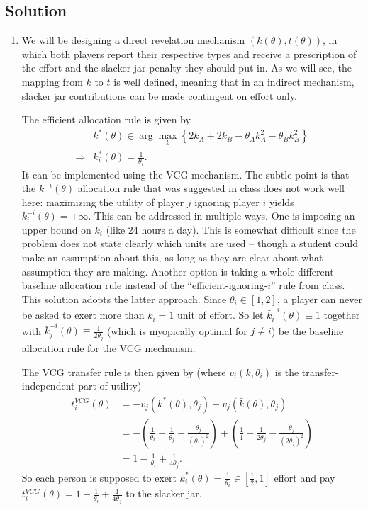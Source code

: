\documentclass[a4paper]{article}
\newif\ifsolutions
\begin{document}
\ifsolutions
\subsection*{Solution}
\begin{enumerate}
	\item We will be designing a direct revelation mechanism $(k(\theta),t(\theta))$, in which both players report their respective types and receive a prescription of the effort and the slacker jar penalty they should put in. As we will see, the mapping from $k$ to $t$ is well defined, meaning that in an indirect mechanism, slacker jar contributions can be made contingent on effort only.
	
	The efficient allocation rule is given by
	\begin{align*}
		&k^*(\theta) \in \arg \max_k \left\{ 2k_A + 2k_B - \theta_A k_A^2 - \theta_B k_B^2 \right\}
		\\
		\Rightarrow
		&k_i^*(\theta) = \frac{1}{\theta_i}.
	\end{align*}
	It can be implemented using the VCG mechanism. The subtle point is that the $k^{-i}(\theta)$ allocation rule that was suggested in class does not work well here: maximizing the utility of player $j$ ignoring player $i$ yields $k^{-i}_i(\theta) = +\infty$. This can be addressed in multiple ways. One is imposing an upper bound on $k_i$ (like 24 hours a day). This is somewhat difficult since the problem does not state clearly which units are used -- though a student could make an assumption about this, as long as they are clear about what assumption they are making. Another option is taking a whole different baseline allocation rule instead of the ``efficient-ignoring-$i$'' rule from class. This solution adopts the latter approach. Since $\theta_i \in [1,2]$, a player can never be asked to exert more than $k_i = 1$ unit of effort. So let $\bar{k}_i^{-i}(\theta) \equiv 1$ together with $\bar{k}_j^{-i}(\theta) \equiv \frac{1}{2\theta_j}$ (which is myopically optimal for $j \neq i$) be the baseline allocation rule for the VCG mechanism.
	
	The VCG transfer rule is then given by (where $v_i(k,\theta_i)$ is the transfer-independent part of utility)
	\begin{align*}
		t_i^{VCG}(\theta) &= - v_j(k^*(\theta),\theta_j) + v_j(\bar{k}(\theta), \theta_j)
		\\
		&= - \left( \frac{1}{\theta_i} + \frac{1}{\theta_j} - \frac{\theta_j}{(\theta_j)^2} \right) + \left( \frac{1}{1} + \frac{1}{2 \theta_j} - \frac{\theta_j}{(2\theta_j)^2} \right)
		\\
		&= 1-\frac{1}{\theta_i} + \frac{1}{4\theta_j}.
	\end{align*}
	So each person is supposed to exert $k_i^*(\theta) = \frac{1}{\theta_i} \in \left[ \frac{1}{2}, 1 \right]$ effort and pay $t_i^{VCG}(\theta) = 1-\frac{1}{\theta_i} + \frac{1}{4\theta_j}$ to the slacker jar. 
	

\end{enumerate}
\end{document}
